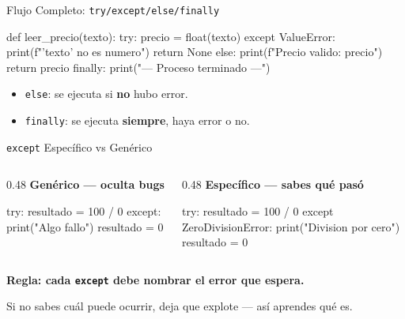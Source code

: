 \documentclass[aspectratio=169, 11pt]{beamer}
\begin{document}
\begin{frame}[fragile,shrink=28]{Flujo Completo: \texttt{try/except/else/finally}}
  \vspace{-6pt}
  \begin{pyblock}
def leer_precio(texto):
    try:
        precio = float(texto)
    except ValueError:
        print(f"'{texto}' no es numero")
        return None
    else:
        print(f"Precio valido: {precio}")
        return precio
    finally:
        print("--- Proceso terminado ---")
  \end{pyblock}

  \vspace{4pt}
  {\scriptsize\color{textMuted}
  \begin{itemize}\setlength{\itemsep}{3pt}
    \item[{\color{arcaRed}\scriptsize\faArrowRight}]
      \texttt{else}: se ejecuta si \textbf{no} hubo error.
    \item[{\color{arcaRed}\scriptsize\faArrowRight}]
      \texttt{finally}: se ejecuta \textbf{siempre}, haya error o no.
  \end{itemize}
  }
\end{frame}

\begin{frame}[fragile,shrink=28]{\texttt{except} Específico vs Genérico}
  \vspace{-6pt}
  \begin{columns}[T]
    \begin{column}{0.48\textwidth}
      {\scriptsize\color{arcaRed}\bfseries\faTimesCircle\hspace{4pt}
        Genérico --- oculta bugs}
      \begin{pyblock}[minted options={fontsize=\scriptsize, breaklines}]
try:
    resultado = 100 / 0
except:
    print("Algo fallo")
    resultado = 0
      \end{pyblock}
    \end{column}

    \begin{column}{0.48\textwidth}
      {\scriptsize\color{codeGreen}\bfseries\faCheckCircle\hspace{4pt}
        Específico --- sabes qué pasó}
      \begin{pyblock}[minted options={fontsize=\scriptsize, breaklines}]
try:
    resultado = 100 / 0
except ZeroDivisionError:
    print("Division por cero")
    resultado = 0
      \end{pyblock}
    \end{column}
  \end{columns}

  \vspace{6pt}
  {\footnotesize\color{arcaDark}\bfseries
    Regla: cada \texttt{except} debe nombrar el error que espera.}

  \vspace{2pt}
  {\scriptsize\color{textMuted}
    Si no sabes cuál puede ocurrir, deja que explote ---
    así aprendes qué es.}
\end{frame}
\end{document}

